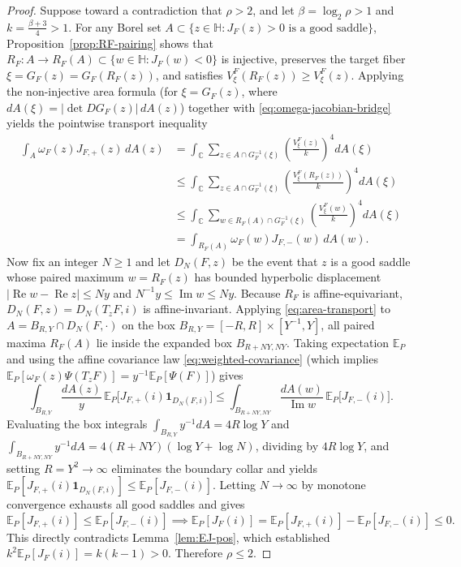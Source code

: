\documentclass[12pt]{article}
\def\C{\mathbb{C}}
\def\H{\mathbb{H}}
\def\E{\mathbb{E}}
\theoremstyle{definition}
\numberwithin{equation}{section}
\begin{document}
\begin{proof}
Suppose toward a contradiction that $\rho > 2$, and let $\beta = \log_2 \rho > 1$ and $k = \frac{\beta+3}{4} > 1$. For any Borel set $A \subset \{z \in \H : J_F(z) > 0 \text{ is a good saddle}\}$, Proposition~\ref{prop:RF-pairing} shows that $R_F : A \to R_F(A) \subset \{w \in \H : J_F(w) < 0\}$ is injective, preserves the target fiber $\xi = G_F(z) = G_F(R_F(z))$, and satisfies $V_\xi^F(R_F(z)) \ge V_\xi^F(z)$. Applying the non-injective area formula (for $\xi = G_F(z)$, where $dA(\xi) = |\det DG_F(z)|\, dA(z)$) together with \eqref{eq:omega-jacobian-bridge} yields the pointwise transport inequality
\begin{align}
  \int_A \omega_F(z) J_{F, +}(z) \, dA(z)
  &= \int_{\C} \sum_{z \in A \cap G_F^{-1}(\xi)} \left(\frac{V_\xi^F(z)}{k}\right)^4 dA(\xi) \nonumber\\
  &\le \int_{\C} \sum_{z \in A \cap G_F^{-1}(\xi)} \left(\frac{V_\xi^F(R_F(z))}{k}\right)^4 dA(\xi) \nonumber\\
  &\le \int_{\C} \sum_{w \in R_F(A) \cap G_F^{-1}(\xi)} \left(\frac{V_\xi^F(w)}{k}\right)^4 dA(\xi) \nonumber\\
  &= \int_{R_F(A)} \omega_F(w) J_{F, -}(w) \, dA(w).\label{eq:area-transport}
\end{align}
Now fix an integer $N \ge 1$ and let $D_N(F, z)$ be the event that $z$ is a good saddle whose paired maximum $w = R_F(z)$ has bounded hyperbolic displacement $|\operatorname{Re} w - \operatorname{Re} z| \le N y$ and $N^{-1} y \le \operatorname{Im} w \le N y$. Because $R_F$ is affine-equivariant, $D_N(F, z) = D_N(T_z F, i)$ is affine-invariant. Applying \eqref{eq:area-transport} to $A = B_{R, Y} \cap D_N(F, \cdot)$ on the box $B_{R, Y} = [-R, R] \times [Y^{-1}, Y]$, all paired maxima $R_F(A)$ lie inside the expanded box $B_{R + NY, NY}$. Taking expectation $\E_P$ and using the affine covariance law \eqref{eq:weighted-covariance} (which implies $\E_P[\omega_F(z) \Psi(T_z F)] = y^{-1} \E_P[\Psi(F)]$) gives
\[
  \int_{B_{R, Y}} \frac{dA(z)}{y} \, \E_P\Big[J_{F, +}(i) \mathbf{1}_{D_N(F, i)}\Big] \le \int_{B_{R + NY, NY}} \frac{dA(w)}{\operatorname{Im} w} \, \E_P\big[J_{F, -}(i)\big].
\]
Evaluating the box integrals $\int_{B_{R, Y}} y^{-1} dA = 4 R \log Y$ and $\int_{B_{R+NY, NY}} y^{-1} dA = 4(R + NY)(\log Y + \log N)$, dividing by $4 R \log Y$, and setting $R = Y^2 \to \infty$ eliminates the boundary collar and yields $\E_P[J_{F, +}(i) \mathbf{1}_{D_N(F, i)}] \le \E_P[J_{F, -}(i)]$. Letting $N \to \infty$ by monotone convergence exhausts all good saddles and gives
\[
  \E_P[J_{F, +}(i)] \le \E_P[J_{F, -}(i)] \implies \E_P[J_F(i)] = \E_P[J_{F, +}(i)] - \E_P[J_{F, -}(i)] \le 0.
\]
This directly contradicts Lemma~\ref{lem:EJ-pos}, which established $k^2 \E_P[J_F(i)] = k(k - 1) > 0$. Therefore $\rho \le 2$.
\end{proof}
\end{document}
